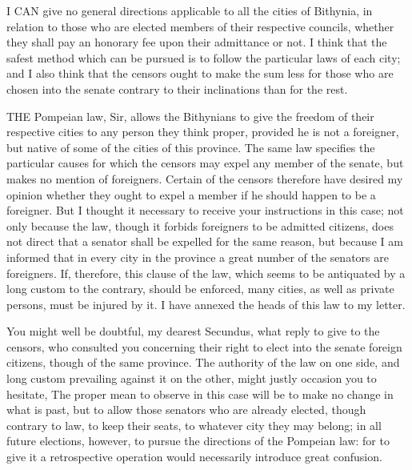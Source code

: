 
I CAN give no general directions applicable to all the cities of Bithynia,
in relation to those who are elected members of their respective councils,
whether they shall pay an honorary fee upon their admittance or not. I
think that the safest method which can be pursued is to follow the
particular laws of each city; and I also think that the censors ought to
make the sum less for those who are chosen into the senate contrary to
their inclinations than for the rest.


THE Pompeian law, Sir, allows the Bithynians to give the freedom of their
respective cities to any person they think proper, provided he is not a
foreigner, but native of some of the cities of this province. The same law
specifies the particular causes for which the censors may expel any member of the senate, but makes no mention of foreigners. Certain of the censors
therefore have desired my opinion whether they ought to expel a member if
he should happen to be a foreigner. But I thought it necessary to receive
your instructions in this case; not only because the law, though it
forbids foreigners to be admitted citizens, does not direct that a senator
shall be expelled for the same reason, but because I am informed that in
every city in the province a great number of the senators are foreigners.
If, therefore, this clause of the law, which seems to be antiquated by a
long custom to the contrary, should be enforced, many cities, as well as
private persons, must be injured by it. I have annexed the heads of this
law to my letter.


You might well be doubtful, my dearest Secundus, what reply to give to the
censors, who consulted you concerning their right to elect into the senate
foreign citizens, though of the same province. The authority of the law on
one side, and long custom prevailing against it on the other, might justly
occasion you to hesitate, The proper mean to observe in this case will be
to make no change in what is past, but to allow those senators who are
already elected, though contrary to law, to keep their seats, to whatever
city they may belong; in all future elections, however, to pursue the
directions of the Pompeian law: for to give it a retrospective operation
would necessarily introduce great confusion.


